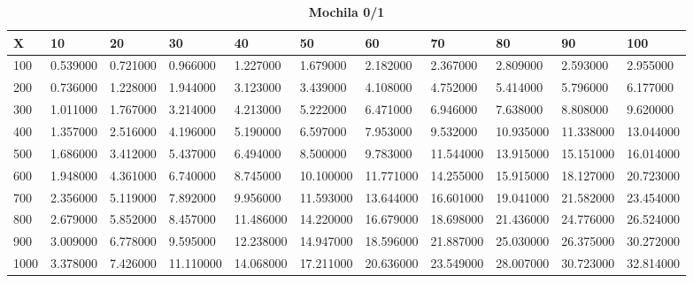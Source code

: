 \documentclass[10pt,letterpaper]{article}
\begin{document}
\newpage 
{}
\begin{center}
\begin{table}\renewcommand{\arraystretch}{2.5}
\caption{\large \textbf{Mochila 0/1}}
\centering
\begin{tabular} { |m{0.5cm}|m{1.3cm}|m{1.3cm}|m{1.3cm}|m{1.3cm}|m{1.3cm}|m{1.3cm}|m{1.3cm}|m{1.3cm}|m{1.3cm}|m{1.3cm}|} 
\hline
\rowcolor{Gray}
\centering \textbf{X} & \centering \textbf{10} & \centering \textbf{20} & \centering \textbf{30}\ & \centering \textbf{40} & \centering \textbf{50} & \centering \textbf{60}\ & \centering \textbf{70} & \centering \textbf{80} & \centering \textbf{90}\ & \textbf{100} \\\hline
\cellcolor{Gray}100 & 0.539000 & 0.721000 & 0.966000 & 1.227000 & 1.679000 & 2.182000 & 2.367000 & 2.809000 & 2.593000 & 2.955000 \\
\hline
\cellcolor{Gray}200 & 0.736000 & 1.228000 & 1.944000 & 3.123000 & 3.439000 & 4.108000 & 4.752000 & 5.414000 & 5.796000 & 6.177000 \\
\hline
\cellcolor{Gray}300 & 1.011000 & 1.767000 & 3.214000 & 4.213000 & 5.222000 & 6.471000 & 6.946000 & 7.638000 & 8.808000 & 9.620000 \\
\hline
\cellcolor{Gray}400 & 1.357000 & 2.516000 & 4.196000 & 5.190000 & 6.597000 & 7.953000 & 9.532000 & 10.935000 & 11.338000 & 13.044000 \\
\hline
\cellcolor{Gray}500 & 1.686000 & 3.412000 & 5.437000 & 6.494000 & 8.500000 & 9.783000 & 11.544000 & 13.915000 & 15.151000 & 16.014000 \\
\hline
\cellcolor{Gray}600 & 1.948000 & 4.361000 & 6.740000 & 8.745000 & 10.100000 & 11.771000 & 14.255000 & 15.915000 & 18.127000 & 20.723000 \\
\hline
\cellcolor{Gray}700 & 2.356000 & 5.119000 & 7.892000 & 9.956000 & 11.593000 & 13.644000 & 16.601000 & 19.041000 & 21.582000 & 23.454000 \\
\hline
\cellcolor{Gray}800 & 2.679000 & 5.852000 & 8.457000 & 11.486000 & 14.220000 & 16.679000 & 18.698000 & 21.436000 & 24.776000 & 26.524000 \\
\hline
\cellcolor{Gray}900 & 3.009000 & 6.778000 & 9.595000 & 12.238000 & 14.947000 & 18.596000 & 21.887000 & 25.030000 & 26.375000 & 30.272000 \\
\hline
\cellcolor{Gray}1000 & 3.378000 & 7.426000 & 11.110000 & 14.068000 & 17.211000 & 20.636000 & 23.549000 & 28.007000 & 30.723000 & 32.814000 \\
\hline
\end{tabular} \\
\end{table}
\end{center}
\end{document}
